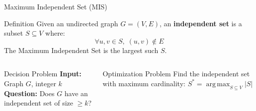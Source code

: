 \documentclass{beamer}
\DeclareMathOperator*{\argmax}{arg\,max}
\begin{document}
\begin{frame}{Maximum Independent Set (MIS)}
    \begin{block}{Definition}
        Given an undirected graph $G=(V,E)$, an \textbf{independent set} is a subset $S \subseteq V$ where:
        \[
        \forall u,v \in S,\; (u,v) \notin E
        \]
        The \textcolor{myred}{Maximum} Independent Set is the largest such $S$.
    \end{block}
    
    \begin{columns}[T]
        \begin{column}{0.5\textwidth}
            \begin{alertblock}{Decision Problem}
                \textbf{Input:} Graph $G$, integer $k$ \\
                \textbf{Question:} Does $G$ have an independent set of size $\geq k$?
            \end{alertblock}
        \end{column}
        \begin{column}{0.5\textwidth}
            \begin{exampleblock}{Optimization Problem}
                Find the independent set with maximum cardinality:
                \centering $S^* = \argmax_{S \subseteq V} |S|$
            \end{exampleblock}
        \end{column}
    \end{columns}
\end{frame}
\end{document}
